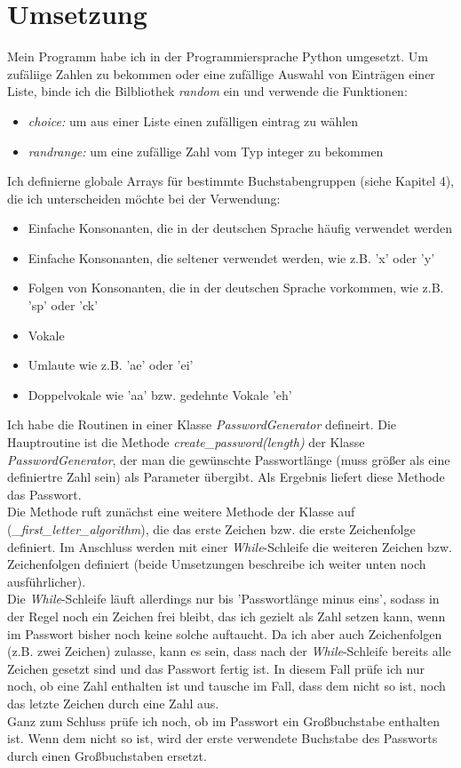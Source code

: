 \documentclass[a4paper,10pt,ngerman]{scrartcl}
\begin{document}
\section{Umsetzung}
Mein Programm habe ich in der Programmiersprache Python umgesetzt. 
Um zufäliige Zahlen zu bekommen oder eine zufällige Auswahl von Einträgen einer Liste, binde ich die Bilbliothek \textit{random} ein und verwende die Funktionen:
\begin{itemize}
    \item \textit{choice:} um aus einer Liste einen zufälligen eintrag zu wählen 
    \item \textit{randrange:} um eine zufällige Zahl vom Typ integer zu bekommen
\end{itemize}
Ich definierne globale Arrays für bestimmte Buchstabengruppen (siehe Kapitel 4), die ich unterscheiden möchte bei der Verwendung:
\begin{itemize}
    \item Einfache Konsonanten, die in der deutschen Sprache häufig verwendet werden
    \item Einfache Konsonanten, die seltener verwendet werden, wie z.B. 'x' oder 'y'
    \item Folgen von Konsonanten, die in der deutschen Sprache vorkommen, wie z.B. 'sp' oder 'ck'
    \item Vokale
    \item Umlaute wie z.B. 'ae' oder 'ei'
    \item Doppelvokale wie 'aa' bzw. gedehnte Vokale 'eh'
\end{itemize}
Ich habe die Routinen in einer Klasse \textit{PasswordGenerator} defineirt. Die Hauptroutine ist die Methode \textit{create\_password(length)} der Klasse \textit{PasswordGenerator}, der man die gewünschte Passwortlänge (muss größer als eine definiertre Zahl sein) als Parameter übergibt. Als Ergebnis liefert diese Methode das Passwort.\\
Die Methode ruft zunächst eine weitere Methode der Klasse auf (\textit{\_first\_letter\_algorithm}), die das erste Zeichen bzw. die erste Zeichenfolge definiert. Im Anschluss werden mit einer \textit{While}-Schleife die weiteren Zeichen bzw. Zeichenfolgen definiert (beide Umsetzungen beschreibe ich weiter unten noch ausführlicher).\\
Die \textit{While}-Schleife läuft allerdings nur bis 'Passwortlänge minus eins', sodass in der Regel noch ein Zeichen frei bleibt, das ich gezielt als Zahl setzen kann, wenn im Passwort bisher noch keine solche auftaucht. Da ich aber auch Zeichenfolgen (z.B. zwei Zeichen) zulasse, kann es sein, dass nach der \textit{While}-Schleife bereits alle Zeichen gesetzt sind und das Passwort fertig ist. In diesem Fall prüfe ich nur noch, ob eine Zahl enthalten ist und tausche im Fall, dass dem nicht so ist, noch das letzte Zeichen durch eine Zahl aus.\\
Ganz zum Schluss prüfe ich noch, ob im Passwort ein Großbuchstabe enthalten ist. Wenn dem nicht so ist, wird der erste verwendete Buchstabe des Passworts durch einen Großbuchstaben ersetzt.\\
\end{document}
